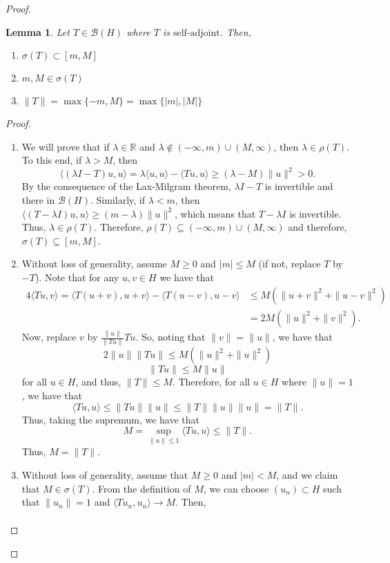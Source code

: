 \documentclass[oneside]{book}
\newtheorem{lemma}{Lemma}
\newcommand{\R}{{\mathbb R}}
\newcommand{\B}{\mathscr{B}}
\newcommand{\la}{\langle}
\newcommand{\ra}{\rangle}
\newcommand{\sbs}{\subset}
\newcommand{\sse}{\subseteq}
\newcommand{\saj}{\text{self-adjoint}}
\begin{document}
\begin{proof}
\begin{lemma}
Let $T \in \B(H)$ where $T$ is $\saj$. Then,
\begin{enumerate}[topsep=-15pt, itemsep=0pt]
\item[(i)] $\sigma(T) \sbs [m, M]$
\item[(ii)] $m, M \in \sigma(T)$
\item[(iii)] $\| T \| = \max\{ -m, M \} = \max\{ |m|, |M| \}$
\end{enumerate}
\end{lemma}
\begin{proof}
\begin{enumerate}
\item[(i)] We will prove that if $\lambda \in \R$ and $\lambda \not\in (-\infty, m) \cup (M, \infty)$, then $\lambda \in \rho(T)$. To this end, if $\lambda > M$, then
\[ \la (\lambda I - T) u, u\ra = \lambda \la u, u \ra - \la Tu, u \ra \geq (\lambda - M) \| u \|^2 > 0. \]
By the consequence of the Lax-Milgram theorem, $\lambda I - T$ is invertible and there in $\B(H)$. Similarly, if $\lambda < m$, then $\la (T - \lambda I) u, u \ra \geq (m - \lambda) \| u \|^2$, which means that $T - \lambda I$ is invertible. Thus, $\lambda \in \rho(T)$. Therefore, $\rho(T) \sse (-\infty, m) \cup (M,\infty)$ and therefore, $\sigma(T) \sse [m, M]$. 
\item[(iii)] Without loss of generality, assume $M \geq 0$ and $|m |\leq M$ (if not, replace $T$ by $-T$). Note that for any $u, v \in H$ we have that 
\begin{align*}
4 \la Tu, v \ra = \la T(u + v), u + v \ra - \la T(u - v), u -v \ra & \leq M \left( \| u + v \|^2 + \| u - v \|^2 \right) \\
& = 2 M \left( \| u \|^2 + \| v \|^2 \right).
\end{align*}
Now, replace $v$ by $\frac{\| u \|}{\| Tu \|} Tu$. So, noting that $\| v \| = \| u \|$, we have that 
\[ 2 \| u \| \| T u \| \leq M \left( \| u \|^2  + \| u \|^2 \right)\]
\[ \| T u \| \leq M \| u \|\]
for all $u \in H$, and thus, $ \| T \| \leq M$. Therefore, for all $u \in H$ where $ \| u \| = 1$, we have that 
\[ \la Tu, u \ra \leq \| T u \| \| u \| \leq \| T \| \| u \| \| u \| = \| T \|.\]
Thus, taking the supremum, we have that 
\[ M = \sup\limits_{\| u \| \leq 1} \la Tu, u \ra \leq \| T \|.\]
Thus, $M = \| T \|$. 
\item[(ii)] Without loss of generality, assume that $M \geq 0$ and $|m |< M$, and we claim that $M \in \sigma(T)$. From the definition of $M$, we can choose $(u_n) \sbs H$ such that $\|u_n \| = 1$ and $\la  T u_n , u_n \ra \to M$. Then, 
\begin{align*}

\end{align*}
\end{enumerate}
\end{proof}
\end{proof}
\end{document}
